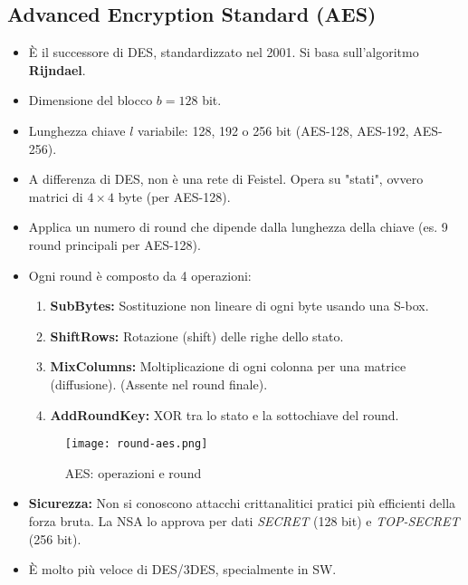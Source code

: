 \documentclass[../main.tex]{subfiles}
\begin{document}
\subsection{Advanced Encryption Standard (AES)}
\begin{itemize}
    \item È il successore di DES, standardizzato nel 2001. Si basa sull'algoritmo \textbf{Rijndael}.
    \item Dimensione del blocco $b=128$ bit.
    \item Lunghezza chiave $l$ variabile: 128, 192 o 256 bit (AES-128, AES-192, AES-256).
    \item A differenza di DES, non è una rete di Feistel. Opera su "stati", ovvero matrici di $4 \times 4$ byte (per AES-128).
    \item Applica un numero di round che dipende dalla lunghezza della chiave (es. 9 round principali per AES-128).
    \item Ogni round è composto da 4 operazioni:
          \begin{enumerate}
              \item \textbf{SubBytes:} Sostituzione non lineare di ogni byte usando una S-box.
              \item \textbf{ShiftRows:} Rotazione (shift) delle righe dello stato.
              \item \textbf{MixColumns:} Moltiplicazione di ogni colonna per una matrice (diffusione). (Assente nel round finale).
              \item \textbf{AddRoundKey:} XOR tra lo stato e la sottochiave del round.
          \end{enumerate}
          
    \begin{figure}[H]
      \centering
      \texttt{[image: round-aes.png]}
      \caption{AES: operazioni e round}
      \label{fig:etichetta}
    \end{figure}
    
    \item \textbf{Sicurezza:} Non si conoscono attacchi crittanalitici pratici più efficienti della forza bruta. La NSA lo approva per dati \emph{SECRET} (128 bit) e \emph{TOP-SECRET} (256 bit).
    \item È molto più veloce di DES/3DES, specialmente in SW.
\end{itemize}
\end{document}
